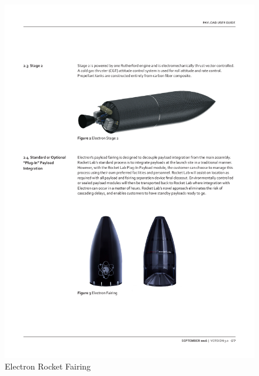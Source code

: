 \newpage
\begin{figure}[h]
\centering 
\includegraphics[scale=0.7]{./sections/Constellation_Deployment/S2-Launcher/Images_S2/Picture_3_S2.pdf} 
\caption{Electron Rocket Fairing}
\end{figure}



